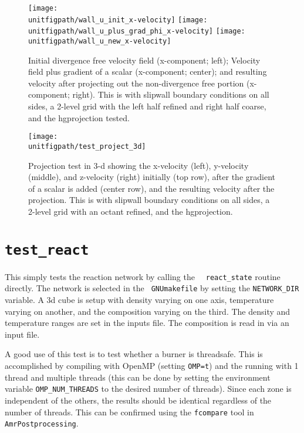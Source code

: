 \begin{figure}[t] 
\centering
\texttt{[image: \\unitfigpath/wall\_u\_init\_x-velocity]} 
\texttt{[image: \\unitfigpath/wall\_u\_plus\_grad\_phi\_x-velocity]} 
\texttt{[image: \\unitfigpath/wall\_u\_new\_x-velocity]} 
%
\caption[Results of the 2-d {\tt test\_projection} unit test]{\label{fig:unit:projtest}
  Initial divergence free velocity field (x-component; left); Velocity
  field plus gradient of a scalar (x-component; center); and resulting
  velocity after projecting out the non-divergence free portion
  (x-component; right).  This is with slipwall boundary conditions on
  all sides, a 2-level grid with the left half refined and right half
  coarse, and the hgprojection tested.}
\end{figure}


\begin{figure}
\centering
\texttt{[image: \\unitfigpath/test\_project\_3d]}
%
\caption[Results of the 3-d {\tt test\_projection} unit test]{\label{fig:unit:projtest3d}
  Projection test in 3-d showing the x-velocity (left), y-velocity
  (middle), and z-velocity (right) initially (top row), after the
  gradient of a scalar is added (center row), and the resulting
  velocity after the projection.  This is with slipwall boundary conditions
  on all sides, a 2-level grid with an octant refined, and the hgprojection.}
\end{figure}

\section{\tt test\_react}

  This simply tests the reaction network by calling the \maestro\ {\tt
  react\_state} routine directly.  The network is selected in the {\tt
  GNUmakefile} by setting the {\tt NETWORK\_DIR} variable.  A 3d cube
  is setup with density varying on one axis, temperature varying on
  another, and the composition varying on the third.  The density and
  temperature ranges are set in the inputs file.  The composition is
  read in via an input file.

  A good use of this test is to test whether a burner is threadsafe.
  This is accomplished by compiling with OpenMP (setting {\tt OMP=t})
  and the running with 1 thread and multiple threads (this can be done
  by setting the environment variable {\tt OMP\_NUM\_THREADS} to the 
  desired number of threads).  Since each zone is independent of the
  others, the results should be identical regardless of the number
  of threads.  This can be confirmed using the {\tt fcompare} tool
  in {\tt AmrPostprocessing}.


